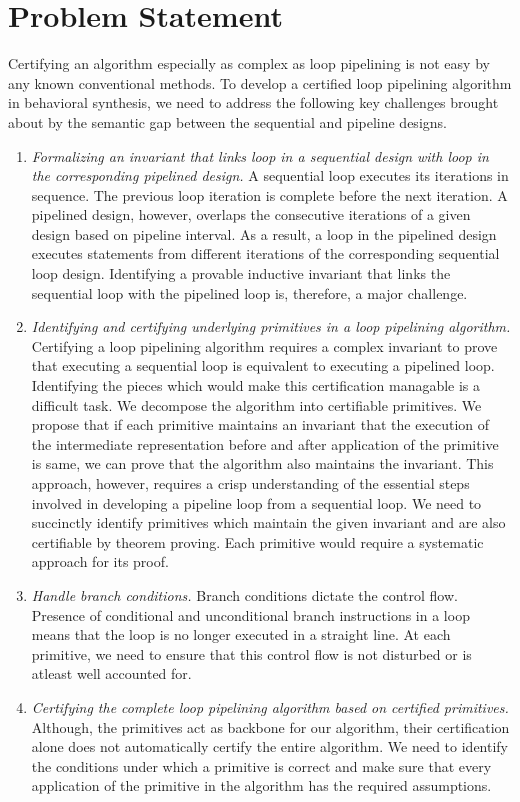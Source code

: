 \section{Problem Statement}
Certifying an algorithm especially as complex as loop pipelining is not easy by any known conventional methods. To develop a certified loop pipelining algorithm in behavioral synthesis,
we need to address the following key challenges brought about by the semantic
gap between the sequential and pipeline designs.
\begin{enumerate}[--]
\item {\em Formalizing an invariant that links loop in a sequential design with loop in the corresponding pipelined design.} A sequential loop executes its iterations in sequence. The previous loop iteration is complete before the next iteration. A pipelined design, however, overlaps the consecutive iterations of a given design based on pipeline interval. As a result, a loop in the pipelined design executes statements from different iterations of the corresponding sequential loop design. Identifying a provable inductive invariant that links the sequential loop with the pipelined loop is, therefore, a major challenge.
\item {\em Identifying and certifying underlying primitives in a loop pipelining algorithm.} Certifying a loop pipelining algorithm requires a complex invariant to prove that executing a sequential loop is equivalent to executing a pipelined loop. Identifying the pieces which would make this certification managable is a difficult task. We decompose the algorithm into certifiable primitives.
We propose that if each primitive maintains an invariant that the execution of the intermediate representation before and after application of the primitive is same, we can prove that the algorithm also maintains the invariant. This approach, however, requires a crisp understanding of the essential steps involved in developing a pipeline loop from a sequential loop. We need to succinctly identify primitives which maintain the given invariant and are also certifiable by theorem proving. Each primitive would require a systematic approach for its proof.
\item {\em Handle branch conditions.}  Branch conditions dictate the control flow. Presence of conditional and unconditional branch instructions in a loop means that the loop is no longer executed in a straight line. At each primitive, we need to ensure that this control flow is not disturbed or is atleast well accounted for. 
\item {\em Certifying the complete loop pipelining algorithm based on certified primitives.} Although, the primitives act as backbone for our algorithm, their certification alone does not automatically certify the entire algorithm. We need to identify the conditions under which a primitive is correct and make sure that every application of the primitive in the algorithm has the required assumptions.
\end{enumerate}

